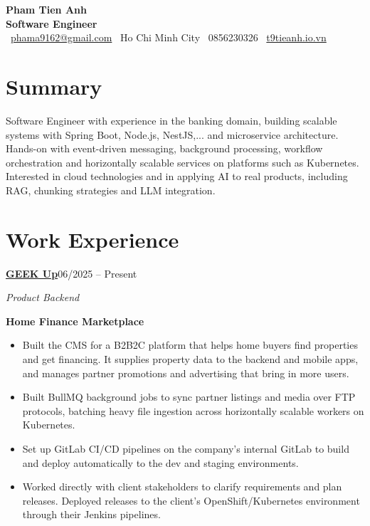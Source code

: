 \documentclass[11pt,a4paper]{article}
\newcommand{\entry}[3]{%
  \textbf{#1}\hfill #2\par\vspace{3pt}
  {\itshape\color{subtle}#3}\par\vspace{1pt}}
\newcommand{\company}[3]{\href{#2}{#1}\normalfont{\small\color{subtle}\quad\href{#2}{#3}}}
\newcommand{\project}[1]{\textbf{#1}\par}
\begin{document}
\begin{center}
  {\fontsize{24}{28}\selectfont\textbf{Pham Tien Anh}}\\[6pt]
  {\large\textbf{Software Engineer}}\\[8pt]
  \faEnvelope\ \href{mailto:phama9162@gmail.com}{phama9162@gmail.com}\quad
  \faMapMarker*\ Ho Chi Minh City\quad
  \faPhone\ 0856230326\quad
  \faGlobe\ \href{https://www.t9tieanh.io.vn/}{t9tieanh.io.vn}
\end{center}

\section{Summary}
Software Engineer with experience in the banking domain, building scalable systems with Spring Boot, Node.js, NestJS,... and microservice architecture. Hands-on with event-driven messaging, background processing, workflow orchestration and horizontally scalable services on platforms such as Kubernetes. Interested in cloud technologies and in applying AI to real products, including RAG, chunking strategies and LLM integration.

\begingroup
{}
\section{Work Experience}
\entry{\company{GEEK Up}{https://geekup.vn/}{geekup.vn}}{06/2025 -- Present}{Product Backend}

\project{Home Finance Marketplace}
\begin{itemize}
  \item Built the CMS for a B2B2C platform that helps home buyers find properties and get financing. It supplies property data to the backend and mobile apps, and manages partner promotions and advertising that bring in more users.
  \item Built BullMQ background jobs to sync partner listings and media over FTP protocols, batching heavy file ingestion across horizontally scalable workers on Kubernetes.
  \item Set up GitLab CI/CD pipelines on the company's internal GitLab to build and deploy automatically to the dev and staging environments.
  \item Worked directly with client stakeholders to clarify requirements and plan releases. Deployed releases to the client's OpenShift/Kubernetes environment through their Jenkins pipelines.
\end{itemize}
\vspace{8pt}
\end{document}
